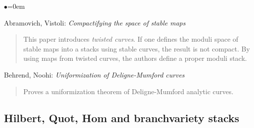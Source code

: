\begin{list}{$\bullet$}{\leftmargin=0em}
\item Abramovich, Vistoli:  \emph{Compactifying the space of stable maps}
\cite{abramovich-vistoli}
\begin{quote}
This paper introduces \emph{twisted curves}.  If one defines the moduli
space of stable maps into a stacks using stable curves, the result is not
compact.  By using maps from twisted curves, the authors define a proper
moduli stack.  
\end{quote}
\smallskip
\item Behrend, Noohi: \emph{Uniformization of Deligne-Mumford curves}
\cite{behrend-noohi}
\begin{quote}
Proves a uniformization theorem of Deligne-Mumford analytic curves.
\end{quote}
\end{list}

\subsection{Hilbert, Quot, Hom and branchvariety stacks}
\label{subsection-hilbert-quot-hom}

